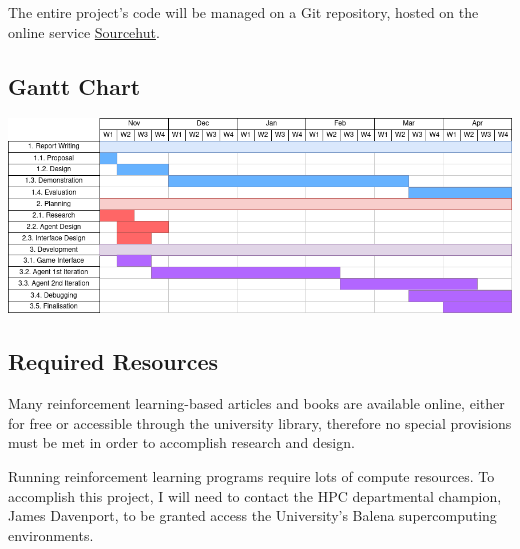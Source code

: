 \documentclass[11pt,a4paper]{article}
\begin{document}
The entire project's code will be managed on a Git repository, hosted on the online service \href{https://sourcehut.org}{Sourcehut}.

\subsection{Gantt Chart}
\includegraphics[scale=0.40]{ga}

\subsection{Required Resources}
Many reinforcement learning-based articles and books are available online, either for free or accessible through the university library, therefore no special provisions must be met in order to accomplish research and design.

Running reinforcement learning programs require lots of compute resources. To accomplish this project, I will need to contact the HPC departmental champion, James Davenport, to be granted access the University's Balena supercomputing environments.

\medskip



\end{document}

